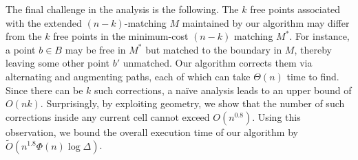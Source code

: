 The final challenge in the analysis is the following. The $k$ free points associated with the extended $(n-k)$-matching $M$ maintained by our algorithm may differ from the $k$ free points in the minimum-cost $(n-k)$ matching $M^*$. For instance, a point $b \in B$ may be free in $M^*$ but matched to the boundary in $M$, thereby leaving some other point $b'$ unmatched. Our algorithm corrects them via alternating and augmenting paths, each of which can take $\Theta(n)$ time to find. Since there can be $k$ such corrections, a na\"ive analysis leads to an upper bound of $O(nk)$. Surprisingly, by exploiting geometry, we show that the number of such corrections inside any current cell cannot exceed $O(n^{0.8})$. Using this observation, we bound the overall execution time of our algorithm by $\tilde{O}(n^{1.8}\Phi(n)\log \Delta)$.







